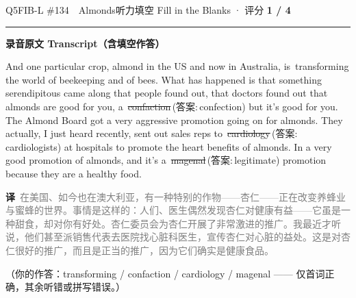 \documentclass[11pt]{article}
\newcommand{\ptesub}[1]{%
  \par\needspace{2\baselineskip}\smallskip
  {\color{cAccent}\rule[-0.2ex]{3pt}{1.05em}}\hspace{6pt}%
  {\bfseries\color{cHead}#1}\par\nopagebreak\smallskip}
\newcommand{\zh}[1]{{\footnotesize\textcolor{cNote}{\textbf{译}}\ \textcolor{gray}{#1}}}
\newcommand{\rok}[1]{{\color{cFix}\ding{51}\,#1}}                 %
\newcommand{\rno}[2]{{\color{cWrong}\ding{55}\,\sout{#1}}\,{\footnotesize\color{cFix}(答案:\,#2)}}  %
\begin{document}
\begin{qblock}{Q5\quad FIB-L \#134\ \ Almonds}{听力填空 Fill in the Blanks · 评分 \textcolor{cAccent}{\bfseries 1 / 4}}
\ptesub{录音原文 Transcript（含填空作答）}
\begin{promptbox}
And one particular crop, almond in the US and now in Australia, is \rok{transforming} the world of beekeeping and of bees. What has happened is that something serendipitous came along that people found out, that doctors found out that almonds are good for you, a \rno{confaction}{confection} but it's good for you. The Almond Board got a very aggressive promotion going on for almonds. They actually, I just heard recently, sent out sales reps to \rno{cardiology}{cardiologists} at hospitals to promote the heart benefits of almonds. In a very good promotion of almonds, and it's a \rno{magenal}{legitimate} promotion because they are a healthy food.
\end{promptbox}
\zh{在美国、如今也在澳大利亚，有一种特别的作物——杏仁——正在改变养蜂业与蜜蜂的世界。事情是这样的：人们、医生偶然发现杏仁对健康有益——它虽是一种甜食，却对你有好处。杏仁委员会为杏仁开展了非常激进的推广。我最近才听说，他们甚至派销售代表去医院找心脏科医生，宣传杏仁对心脏的益处。这是对杏仁很好的推广，而且是正当的推广，因为它们确实是健康食品。}
\par{\footnotesize\color{gray}（你的作答：transforming / confaction / cardiology / magenal —— 仅首词正确，其余听错或拼写错误。）}
\end{qblock}
\end{document}
